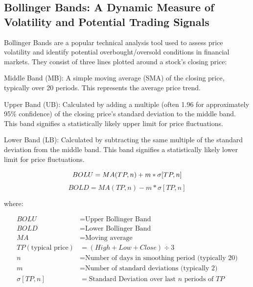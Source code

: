 \documentclass[9pt,a4paper,twoside]{tau}
\begin{document}
    \subsection{Bollinger Bands: A Dynamic Measure of Volatility and Potential Trading Signals}
    
        Bollinger Bands are a popular technical analysis tool used to assess price volatility and identify potential overbought/oversold conditions in financial markets.  They consist of three lines plotted around a stock's closing price:
        
        Middle Band (MB): A simple moving average (SMA) of the closing price, typically over 20 periods. This represents the average price trend.
        
        Upper Band (UB): Calculated by adding a multiple (often 1.96 for approximately 95\% confidence) of the closing price's standard deviation to the middle band. This band signifies a statistically likely upper limit for price fluctuations.
        
        Lower Band (LB): Calculated by subtracting the same multiple of the standard deviation from the middle band. This band signifies a statistically likely lower limit for price fluctuations.
        
        \begin{equation}
        BOLU = MA(TP, n) + m * \sigma[TP, n] \\
        \end{equation}
        \begin{equation}
        BOLD = MA(TP, n) - m * \sigma[TP, n] 
        \end{equation}
        
        where:
        
        \begin{align*}
        BOLU &= \text{Upper Bollinger Band} \\
        BOLD &= \text{Lower Bollinger Band} \\
        MA &= \text{Moving average} \\
        TP (\text{typical price}) &= (High + Low + Close) \div 3 \\
        n &= \text{Number of days in smoothing period (typically 20)} \\
        m &= \text{Number of standard deviations (typically 2)} \\
        \sigma[TP, n] &= \text{Standard Deviation over last } n \text{ periods of } TP
        \end{align*}
    
\end{document}
